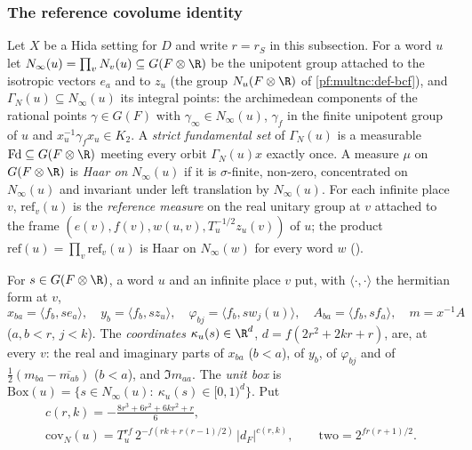 \subsubsection{The reference covolume identity}

Let $X$ be a Hida setting for $D$ and write $r=r_S$ in this subsection. For a word $u$ let $N_\infty(u)=\prod_vN_v(u)\subseteq
G(F\otimes\R)$ be the unipotent group attached to the isotropic vectors $e_a$ and to $z_u$ (the group $N_u(F\otimes\R)$ of
\cref{pf:multnc:def-bcf}), and $\Gamma_N(u)\subseteq N_\infty(u)$ its integral points: the archimedean components of the
rational points $\gamma\in G(F)$ with $\gamma_\infty\in N_\infty(u)$, $\gamma_f$ in the finite unipotent group of $u$ and
$x_u^{-1}\gamma_fx_u\in K_2$. A \emph{strict fundamental set} of $\Gamma_N(u)$ is a measurable $\mathrm{Fd}\subseteq
G(F\otimes\R)$ meeting every orbit $\Gamma_N(u)x$ exactly once. A measure $\mu$ on $G(F\otimes\R)$ is \emph{Haar on}
$N_\infty(u)$ if it is $\sigma$-finite, non-zero, concentrated on $N_\infty(u)$ and invariant under left translation by
$N_\infty(u)$. For each infinite place $v$, $\mathrm{ref}_v(u)$ is the \emph{reference measure} on the real unitary group at
$v$ attached to the frame $(e(v),f(v),w(u,v),T_u^{-1/2}z_u(v))$ of $u$; the product
$\mathrm{ref}(u)=\prod_v\mathrm{ref}_v(u)$ is Haar on $N_\infty(w)$ for every word $w$
().

\begin{definition}\label{pf:sh-siegel:kapdef}
For $s\in G(F\otimes\R)$, a word $u$ and an infinite place $v$ put, with $\langle\cdot,\cdot\rangle$ the hermitian form at $v$,
\[
x_{ba}=\langle f_b,se_a\rangle,\quad y_b=\langle f_b,sz_u\rangle,\quad\varphi_{bj}=\langle f_b,sw_j(u)\rangle,\quad
A_{ba}=\langle f_b,sf_a\rangle,\quad m=x^{-1}A
\]
($a,b<r$, $j<k$). The \emph{coordinates} $\kappa_u(s)\in\R^{d}$, $d=f(2r^2+2kr+r)$, are, at every $v$: the real and imaginary
parts of $x_{ba}$ ($b<a$), of $y_b$, of $\varphi_{bj}$ and of $\frac12(m_{ba}-\overline{m_{ab}})$ ($b<a$), and $\Im m_{aa}$. The
\emph{unit box} is $\mathrm{Box}(u)=\{s\in N_\infty(u):\ \kappa_u(s)\in[0,1)^d\}$. Put
\begin{gather*}
c(r,k)=-\frac{8r^3+6r^2+6kr^2+r}{6},\\
\mathrm{cov}_N(u)=T_u^{rf}\,2^{-f(rk+r(r-1)/2)}\,|d_F|^{c(r,k)},\qquad\mathrm{two}=2^{fr(r+1)/2}.
\end{gather*}
\ \ 
\end{definition}

